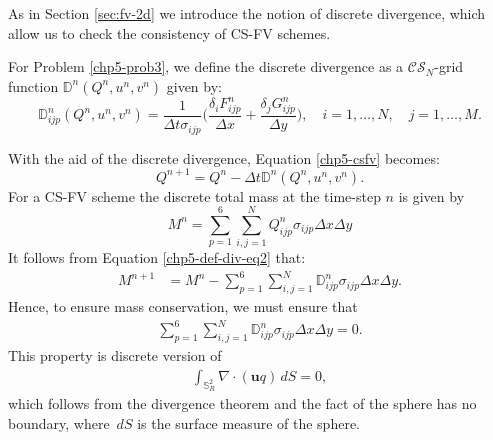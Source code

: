 As in Section \ref{sec:fv-2d}  we introduce the notion of discrete divergence,
which allow us to check the consistency of CS-FV schemes.
\begin{definition}
	\label{chp5-def-div}
	For Problem \ref{chp5-prob3}, we define the discrete divergence as a 
	$\mathcal{CS}_N$-grid function $\mathbb{D}^n(Q^n,u^n,v^n)$
	given by:
	\begin{equation}
		\label{chp5-def-div-eq}
		\mathbb{D}_{ijp}^n(Q^n,u^n,v^n)=  \frac{1}{\Delta t \sigma_{ijp}}
		\bigg(\frac{\delta_i {F}_{ijp}^{n}}{\Delta x} + \frac{\delta_j {G}_{ijp}^{n}}{\Delta y} \bigg), 
		\quad i = 1, \ldots, N, \quad j=1, \ldots,M.
	\end{equation}
\end{definition}
With the aid of the discrete divergence, Equation \eqref{chp5-csfv} becomes:
	\begin{equation}
	\label{chp5-def-div-eq2}
	Q^{n+1} = Q^n - \Delta t \mathbb{D}^n(Q^n,u^n,v^n).
\end{equation}
For a CS-FV scheme the discrete total mass at the time-step $n$ is given by
\begin{equation*}
	M^n =\sum_{p=1}^6 \sum_{i,j=1}^N Q_{ijp}^n \sigma_{ijp} \Delta x \Delta y 
\end{equation*}
It follows from Equation \eqref{chp5-def-div-eq2} that:
\begin{align*}
	M^{n+1} &= M^n  - \sum_{p=1}^6 \sum_{i,j=1}^N \mathbb{D}_{ijp}^{n} \sigma_{ijp} \Delta x \Delta y .
\end{align*}
Hence, to ensure mass conservation, we must ensure that
\begin{align*}
	\sum_{p=1}^6 \sum_{i,j=1}^N   \mathbb{D}_{ijp}^{n} \sigma_{ijp} \Delta x \Delta y = 0.
\end{align*}
This property is discrete version of
\begin{align*}
	\int_{\mathbb{S}^2_R} \nabla \cdot (\boldsymbol{u}q) \,dS = 0,
\end{align*}
which follows from the divergence theorem and the fact of the sphere has no boundary, where $\,dS$ is the surface measure of the sphere.

